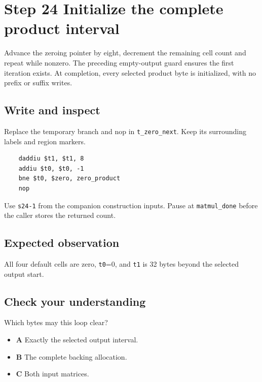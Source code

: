 \section{Step 24 Initialize the complete product interval}\label{matmul-s24}

Advance the zeroing pointer by eight, decrement the remaining cell count and repeat while nonzero. The preceding empty-output guard ensures the first iteration exists. At completion, every selected product byte is initialized, with no prefix or suffix writes.

\subsection{Write and inspect}
Replace the temporary branch and nop in \texttt{t\_zero\_next}. Keep its surrounding labels and region markers.

\begin{verbatim}
    daddiu $t1, $t1, 8
    addiu $t0, $t0, -1
    bne $t0, $zero, zero_product
    nop
\end{verbatim}
Use \texttt{s24-1} from the companion construction inputs. Pause at \texttt{matmul\_done} before the caller stores the returned count.

\subsection{Expected observation}
All four default cells are zero, \texttt{t0}=0, and \texttt{t1} is 32 bytes beyond the selected output start.

\subsection{Check your understanding}
Which bytes may this loop clear?

\begin{itemize}
\item \textbf{A} Exactly the selected output interval.
\item \textbf{B} The complete backing allocation.
\item \textbf{C} Both input matrices.
\end{itemize}

